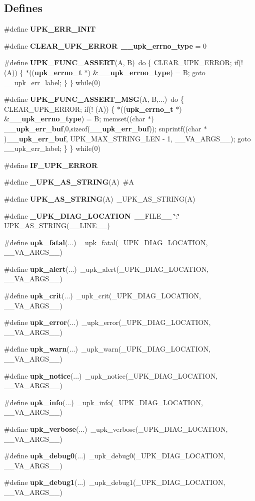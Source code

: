 \subsection*{Defines}
\begin{DoxyCompactItemize}
\item 
\#define {\bf UPK\_\-ERR\_\-INIT}
\item 
\#define {\bf CLEAR\_\-UPK\_\-ERROR}~{\bf \_\-\_\-upk\_\-errno\_\-type} = 0
\item 
\#define {\bf UPK\_\-FUNC\_\-ASSERT}(A, B)~do \{ CLEAR\_\-UPK\_\-ERROR; if(! (A)) \{ $\ast$(({\bf upk\_\-errno\_\-t} $\ast$) \&{\bf \_\-\_\-upk\_\-errno\_\-type}) = B; goto \_\-\_\-upk\_\-err\_\-label; \} \} while(0)
\item 
\#define {\bf UPK\_\-FUNC\_\-ASSERT\_\-MSG}(A, B,...)~do \{ CLEAR\_\-UPK\_\-ERROR; if(! (A)) \{ $\ast$(({\bf upk\_\-errno\_\-t} $\ast$) \&{\bf \_\-\_\-upk\_\-errno\_\-type}) = B; memset((char $\ast$) {\bf \_\-\_\-upk\_\-err\_\-buf},0,sizeof({\bf \_\-\_\-upk\_\-err\_\-buf})); snprintf((char $\ast$){\bf \_\-\_\-upk\_\-err\_\-buf}, UPK\_\-MAX\_\-STRING\_\-LEN -\/ 1, \_\-\_\-VA\_\-ARGS\_\-\_\-); goto \_\-\_\-upk\_\-err\_\-label; \} \} while(0)
\item 
\#define {\bf IF\_\-UPK\_\-ERROR}
\item 
\#define {\bf \_\-UPK\_\-AS\_\-STRING}(A)~\#A
\item 
\#define {\bf UPK\_\-AS\_\-STRING}(A)~\_\-UPK\_\-AS\_\-STRING(A)
\item 
\#define {\bf \_\-UPK\_\-DIAG\_\-LOCATION}~\_\-\_\-FILE\_\-\_\- \char`\"{}:\char`\"{} UPK\_\-AS\_\-STRING(\_\-\_\-LINE\_\-\_\-)
\item 
\#define {\bf upk\_\-fatal}(...)~\_\-upk\_\-fatal(\_\-UPK\_\-DIAG\_\-LOCATION, \_\-\_\-VA\_\-ARGS\_\-\_\-)
\item 
\#define {\bf upk\_\-alert}(...)~\_\-upk\_\-alert(\_\-UPK\_\-DIAG\_\-LOCATION, \_\-\_\-VA\_\-ARGS\_\-\_\-)
\item 
\#define {\bf upk\_\-crit}(...)~\_\-upk\_\-crit(\_\-UPK\_\-DIAG\_\-LOCATION, \_\-\_\-VA\_\-ARGS\_\-\_\-)
\item 
\#define {\bf upk\_\-error}(...)~\_\-upk\_\-error(\_\-UPK\_\-DIAG\_\-LOCATION, \_\-\_\-VA\_\-ARGS\_\-\_\-)
\item 
\#define {\bf upk\_\-warn}(...)~\_\-upk\_\-warn(\_\-UPK\_\-DIAG\_\-LOCATION, \_\-\_\-VA\_\-ARGS\_\-\_\-)
\item 
\#define {\bf upk\_\-notice}(...)~\_\-upk\_\-notice(\_\-UPK\_\-DIAG\_\-LOCATION, \_\-\_\-VA\_\-ARGS\_\-\_\-)
\item 
\#define {\bf upk\_\-info}(...)~\_\-upk\_\-info(\_\-UPK\_\-DIAG\_\-LOCATION, \_\-\_\-VA\_\-ARGS\_\-\_\-)
\item 
\#define {\bf upk\_\-verbose}(...)~\_\-upk\_\-verbose(\_\-UPK\_\-DIAG\_\-LOCATION, \_\-\_\-VA\_\-ARGS\_\-\_\-)
\item 
\#define {\bf upk\_\-debug0}(...)~\_\-upk\_\-debug0(\_\-UPK\_\-DIAG\_\-LOCATION, \_\-\_\-VA\_\-ARGS\_\-\_\-)
\item 
\#define {\bf upk\_\-debug1}(...)~\_\-upk\_\-debug1(\_\-UPK\_\-DIAG\_\-LOCATION, \_\-\_\-VA\_\-ARGS\_\-\_\-)
\end{DoxyCompactItemize}
